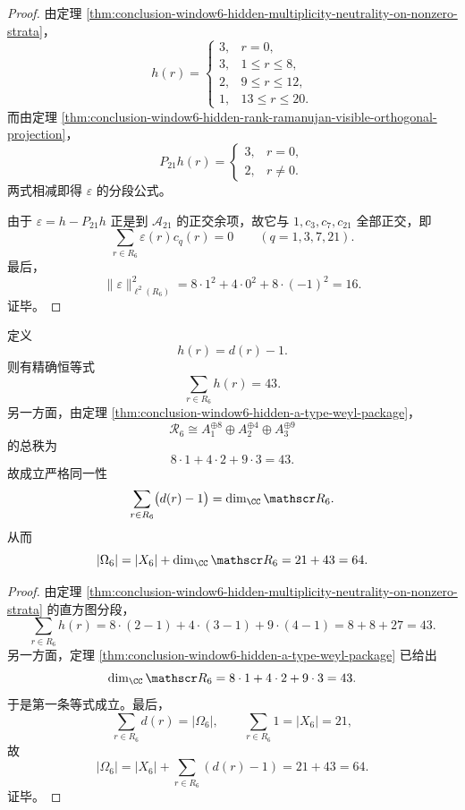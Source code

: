 \begin{proof}
由定理 \ref{thm:conclusion-window6-hidden-multiplicity-neutrality-on-nonzero-strata}，
\[
h(r)=
\begin{cases}
3,& r=0,\\
3,& 1\le r\le 8,\\
2,& 9\le r\le 12,\\
1,& 13\le r\le 20.
\end{cases}
\]
而由定理 \ref{thm:conclusion-window6-hidden-rank-ramanujan-visible-orthogonal-projection}，
\[
P_{21}h(r)=
\begin{cases}
3,& r=0,\\
2,& r\neq 0.
\end{cases}
\]
两式相减即得 \(\varepsilon\) 的分段公式。

由于 \(\varepsilon=h-P_{21}h\) 正是到 \(\mathcal A_{21}\) 的正交余项，故它与 \(1,c_3,c_7,c_{21}\) 全部正交，即
\[
\sum_{r\in R_6}\varepsilon(r)c_q(r)=0
\qquad (q=1,3,7,21).
\]
最后，
\[
\|\varepsilon\|_{\ell^2(R_6)}^2
=
8\cdot 1^2+4\cdot 0^2+8\cdot (-1)^2
=
16.
\]
证毕。
\end{proof}

\begin{theorem}\label{thm:conclusion-window6-total-fiber-excess-hidden-reflection-rank-identity}
定义
\[
h(r)=d(r)-1.
\]
则有精确恒等式
\[
\sum_{r\in R_6}h(r)=43.
\]
另一方面，由定理 \ref{thm:conclusion-window6-hidden-a-type-weyl-package}，
\[
\mathscr R_6\cong A_1^{\oplus 8}\oplus A_2^{\oplus 4}\oplus A_3^{\oplus 9}
\]
的总秩为
\[
8\cdot 1+4\cdot 2+9\cdot 3=43.
\]
故成立严格同一性
\[
\sum_{r\in R_6}\bigl(d(r)-1\bigr)=\dim_{\CC}\mathscr R_6.
\]
从而
\[
|\Omega_6|
=
|X_6|+\dim_{\CC}\mathscr R_6
=
21+43
=
64.
\]
\end{theorem}

\begin{proof}
由定理 \ref{thm:conclusion-window6-hidden-multiplicity-neutrality-on-nonzero-strata} 的直方图分段，
\[
\sum_{r\in R_6}h(r)
=
8\cdot (2-1)+4\cdot (3-1)+9\cdot (4-1)
=
8+8+27
=
43.
\]
另一方面，定理 \ref{thm:conclusion-window6-hidden-a-type-weyl-package} 已给出
\[
\dim_{\CC}\mathscr R_6
=
8\cdot 1+4\cdot 2+9\cdot 3
=
43.
\]
于是第一条等式成立。最后，
\[
\sum_{r\in R_6}d(r)=|\Omega_6|,
\qquad
\sum_{r\in R_6}1=|X_6|=21,
\]
故
\[
|\Omega_6|
=
|X_6|+\sum_{r\in R_6}(d(r)-1)
=
21+43
=
64.
\]
证毕。
\end{proof}

